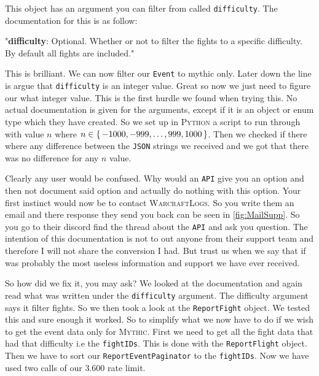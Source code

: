 \documentclass[10pt, a4paper]{memoir}
\numberwithin{equation}{section}
\theoremstyle{plain}
\theoremstyle{defp}
\theoremstyle{dotless}
\theoremstyle{definition}
\theoremstyle{dotless}
\theoremstyle{dotless}
\theoremstyle{defp}
\theoremstyle{defp}
\theoremstyle{be}          %
\theoremstyle{defp}
\newcommand\ttt[1]{\texttt{#1}}
\begin{document}
This object has an argument you can filter from called \ttt{difficulty}. The documentation for this is as follow:

\begin{displayquote}
"\textbf{difficulty}: Optional. Whether or not to filter the fights to a specific difficulty. By default all fights are included."
\end{displayquote}

This is brilliant. We can now filter our \ttt{Event} to mythic only. Later down the line is argue that \ttt{difficulty} is an integer value. Great so now we just need to figure our what integer value. This is the first hurdle we found when trying this. No actual documentation is given for the arguments, except if it is an object or enum type which they have created. So we set up in \textsc{Python} a script to run through with value $n$ where $n\in\set{-1000,-999,\dots,999,1000}$. Then we checked if there where any difference between the \ttt{JSON} strings we received and we got that there was no difference for any $n$ value. 

\medskip

Clearly any user would be confused. Why would an \ttt{API} give you an option and then not document said option and actually do nothing with this option. Your first instinct would now be to contact  \textsc{WarcraftLogs}. So you write them an email and there response they send you back can be seen in \cref{fig:MailSupp}. So you go to their discord find the thread about the \ttt{API} and ask you question. The intention of this documentation is not to out anyone from their support team and therefore I will not share the conversion I had. But trust us when we say that if was probably the most useless information and support we have ever received. 

\medskip

So how did we fix it, you may ask? We looked at the documentation and again read what was written under the \ttt{difficulty} argument. The difficulty argument says it filter fights. So we then took a look at the \ttt{ReportFight} object. We tested this and sure enough it worked. So to simplify what we now have to do if we wish to get the event data only for \textsc{Mythic}. First we need to get all the fight data that had that difficulty i.e the \ttt{fightIDs}. This is done with the \ttt{ReportFlight} object. Then we have to sort our \ttt{ReportEventPaginator} to the \ttt{fightIDs}. Now we have used two calls of our 3.600 rate limit.
\end{document}
